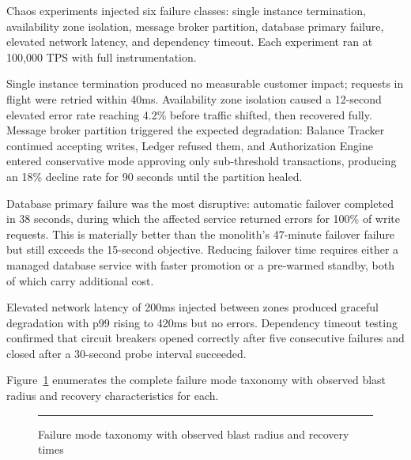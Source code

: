 Chaos experiments injected six failure classes: single instance termination, availability zone isolation, message broker partition, database primary failure, elevated network latency, and dependency timeout. Each experiment ran at 100,000 TPS with full instrumentation.

Single instance termination produced no measurable customer impact; requests in flight were retried within 40ms. Availability zone isolation caused a 12-second elevated error rate reaching 4.2\% before traffic shifted, then recovered fully. Message broker partition triggered the expected degradation: Balance Tracker continued accepting writes, Ledger refused them, and Authorization Engine entered conservative mode approving only sub-threshold transactions, producing an 18\% decline rate for 90 seconds until the partition healed.

Database primary failure was the most disruptive: automatic failover completed in 38 seconds, during which the affected service returned errors for 100\% of write requests. This is materially better than the monolith's 47-minute failover failure but still exceeds the 15-second objective. Reducing failover time requires either a managed database service with faster promotion or a pre-warmed standby, both of which carry additional cost.

Elevated network latency of 200ms injected between zones produced graceful degradation with p99 rising to 420ms but no errors. Dependency timeout testing confirmed that circuit breakers opened correctly after five consecutive failures and closed after a 30-second probe interval succeeded.

Figure~\ref{fig:failure-modes-tree} enumerates the complete failure mode taxonomy with observed blast radius and recovery characteristics for each.

\begin{figure}[htbp]
\centering
\rule{0.8\textwidth}{0.45\textwidth}
\caption{Failure mode taxonomy with observed blast radius and recovery times}
\label{fig:failure-modes-tree}
\end{figure}
